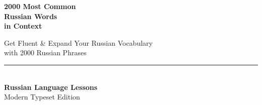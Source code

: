\thispagestyle{empty}
\begin{center}
\vspace*{1.5cm}

{\Huge\sffamily\bfseries\color{primary} 2000 Most Common\\[0.3em] Russian Words\\[0.3em] in Context}\par
\vspace{1.2cm}

{\Large\sffamily\color{secondary} Get Fluent \& Expand Your Russian Vocabulary\\[0.3em] with 2000 Russian Phrases}\par

\vfill

\rule{3.5in}{1.2pt}\\[1.2em]
{\large\sffamily\bfseries\color{primary} Russian Language Lessons}\\[0.4em]
{\small\color{mutedtext} Modern Typeset Edition}\\[1.5cm]

\end{center}
\clearpage
